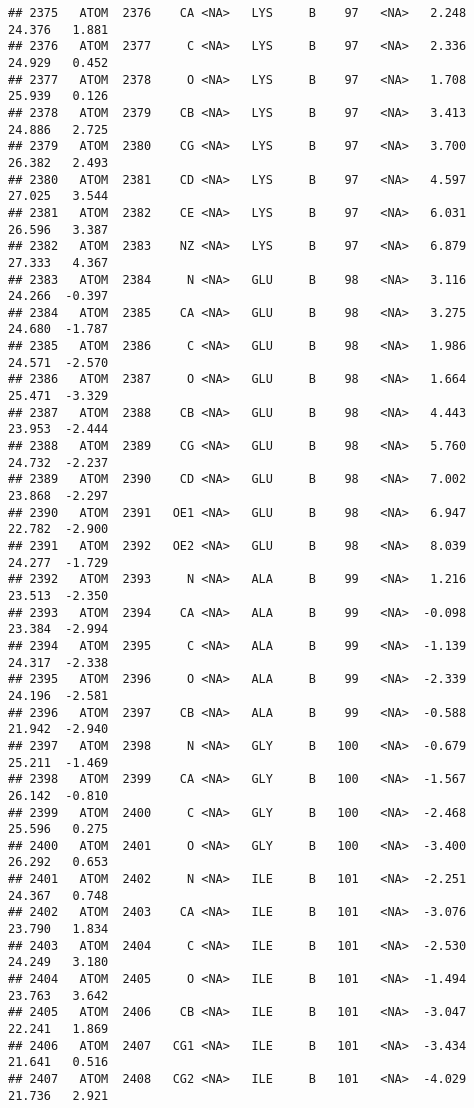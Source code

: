 \documentclass[
]{article}
\begin{document}
\begin{verbatim}
## 2375   ATOM  2376    CA <NA>   LYS     B    97   <NA>   2.248  24.376   1.881
## 2376   ATOM  2377     C <NA>   LYS     B    97   <NA>   2.336  24.929   0.452
## 2377   ATOM  2378     O <NA>   LYS     B    97   <NA>   1.708  25.939   0.126
## 2378   ATOM  2379    CB <NA>   LYS     B    97   <NA>   3.413  24.886   2.725
## 2379   ATOM  2380    CG <NA>   LYS     B    97   <NA>   3.700  26.382   2.493
## 2380   ATOM  2381    CD <NA>   LYS     B    97   <NA>   4.597  27.025   3.544
## 2381   ATOM  2382    CE <NA>   LYS     B    97   <NA>   6.031  26.596   3.387
## 2382   ATOM  2383    NZ <NA>   LYS     B    97   <NA>   6.879  27.333   4.367
## 2383   ATOM  2384     N <NA>   GLU     B    98   <NA>   3.116  24.266  -0.397
## 2384   ATOM  2385    CA <NA>   GLU     B    98   <NA>   3.275  24.680  -1.787
## 2385   ATOM  2386     C <NA>   GLU     B    98   <NA>   1.986  24.571  -2.570
## 2386   ATOM  2387     O <NA>   GLU     B    98   <NA>   1.664  25.471  -3.329
## 2387   ATOM  2388    CB <NA>   GLU     B    98   <NA>   4.443  23.953  -2.444
## 2388   ATOM  2389    CG <NA>   GLU     B    98   <NA>   5.760  24.732  -2.237
## 2389   ATOM  2390    CD <NA>   GLU     B    98   <NA>   7.002  23.868  -2.297
## 2390   ATOM  2391   OE1 <NA>   GLU     B    98   <NA>   6.947  22.782  -2.900
## 2391   ATOM  2392   OE2 <NA>   GLU     B    98   <NA>   8.039  24.277  -1.729
## 2392   ATOM  2393     N <NA>   ALA     B    99   <NA>   1.216  23.513  -2.350
## 2393   ATOM  2394    CA <NA>   ALA     B    99   <NA>  -0.098  23.384  -2.994
## 2394   ATOM  2395     C <NA>   ALA     B    99   <NA>  -1.139  24.317  -2.338
## 2395   ATOM  2396     O <NA>   ALA     B    99   <NA>  -2.339  24.196  -2.581
## 2396   ATOM  2397    CB <NA>   ALA     B    99   <NA>  -0.588  21.942  -2.940
## 2397   ATOM  2398     N <NA>   GLY     B   100   <NA>  -0.679  25.211  -1.469
## 2398   ATOM  2399    CA <NA>   GLY     B   100   <NA>  -1.567  26.142  -0.810
## 2399   ATOM  2400     C <NA>   GLY     B   100   <NA>  -2.468  25.596   0.275
## 2400   ATOM  2401     O <NA>   GLY     B   100   <NA>  -3.400  26.292   0.653
## 2401   ATOM  2402     N <NA>   ILE     B   101   <NA>  -2.251  24.367   0.748
## 2402   ATOM  2403    CA <NA>   ILE     B   101   <NA>  -3.076  23.790   1.834
## 2403   ATOM  2404     C <NA>   ILE     B   101   <NA>  -2.530  24.249   3.180
## 2404   ATOM  2405     O <NA>   ILE     B   101   <NA>  -1.494  23.763   3.642
## 2405   ATOM  2406    CB <NA>   ILE     B   101   <NA>  -3.047  22.241   1.869
## 2406   ATOM  2407   CG1 <NA>   ILE     B   101   <NA>  -3.434  21.641   0.516
## 2407   ATOM  2408   CG2 <NA>   ILE     B   101   <NA>  -4.029  21.736   2.921

\end{verbatim}
\end{document}

